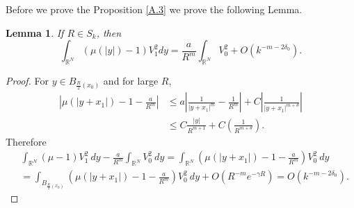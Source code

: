 \documentclass{amsart}
\newtheorem{lemma}[theorem]{Lemma}
\theoremstyle{definition}
\theoremstyle{remark}
\numberwithin{equation}{section}
\begin{document}
Before we prove the Proposition \ref{A.3} we prove the following Lemma.
\begin{lemma}\label{lemma_mu} If $R \in S_k$, then 
\[\int_{\mathbb{R}^N}(\mu(|y|)-1) V_1^{2}dy=\frac{a}{R^{m}}\int_{\mathbb{R}^N}V_0^2+O\left(k^{-m-2\delta_0}\right).\]  \end{lemma}
\begin{proof}
For $y \in B_{\frac{R}{2}(x_0)}$ and for large $R$,
\begin{align*}
 \left|\mu(|y+x_1|)-1- \frac{a}{R^{m}}\right| &\le a\left| \frac{1}{|y+x_1|^m} - \frac{1}{R^m}\right| + C\left|\frac{1}{|y+x_1|^{m+\theta}}\right|\\
 &\le C \frac{|y|}{R^{m+1}} +C\left(\frac{1}{R^{m+\theta}}\right).
\end{align*}
Therefore
\begin{equation*}\label{mu1}
\begin{aligned}
&\int_{\mathbb{R}^N}\left(\mu-1\right) V_1^{2}\:dy - \frac{a}{R^{m}}\int_{\mathbb{R}^N}V_0^2 \:dy =  \int_{\mathbb{R}^N}\left(\mu(|y+x_1|)-1- \frac{a}{R^{m}}\right)V_0^2 \:dy\\
&= \int_{B_{\frac{R}{2}(x_0) }}\left(\mu(|y+x_1|)-1- \frac{a}{R^{m}}\right)V_0^2 \:dy + O\left(R^{-m}e^{-\gamma{R}}\right) = O(k^{-m-2\delta_0}).
\end{aligned}
\end{equation*}



\end{proof}
\end{document}
